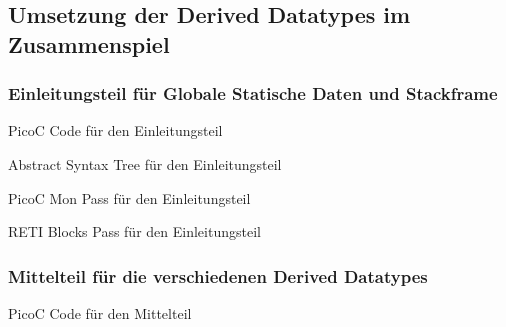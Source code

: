 \subsection{Umsetzung der Derived Datatypes im Zusammenspiel}
\subsubsection{Einleitungsteil für Globale Statische Daten und Stackframe}
\begin{code}
  \centering
  \caption{PicoC Code für den Einleitungsteil}
  \label{code:picoc_code_einleitungsteil}
\end{code}


\begin{code}
  \centering
  \caption{Abstract Syntax Tree für den Einleitungsteil}
  \label{code:abstract_syntax_tree_einleitungsteil}
\end{code}

\begin{code}
  \centering
  \caption{PicoC Mon Pass für den Einleitungsteil}
  \label{code:picoc_mon_pass_einleitungsteil}
\end{code}

\begin{code}
  \centering
  \caption{RETI Blocks Pass für den Einleitungsteil}
  \label{code:reti_blocks_pass_einleitungsteil}
\end{code}

\subsubsection{Mittelteil für die verschiedenen Derived Datatypes}
\label{mittelteil_für_die_verschiedenen_derived_datatypes}

\begin{code}
  \centering
  \caption{PicoC Code für den Mittelteil}
  \label{code:picoc_code_mittelteil}
\end{code}

